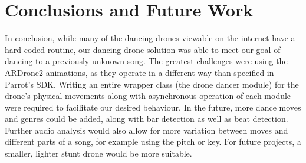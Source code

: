 \section{Conclusions and Future Work} %

In conclusion, while many of the dancing drones viewable on the internet have a
hard-coded routine, our dancing drone solution was able to meet our goal of dancing to
a previously unknown song. The greatest challenges were using the ARDrone2 animations,
as they operate in a different way than specified in Parrot's SDK. Writing an entire
wrapper class (the drone dancer module) for the drone's physical movements along with
asynchronous operation of each module were required to facilitate our desired behaviour.
In the future, more dance moves and genres could be added, along with bar detection
as well as beat detection. Further audio analysis would also allow for more variation
between moves and different parts of a song, for example using the pitch or key.
For future projects, a smaller, lighter stunt drone would be more suitable.


